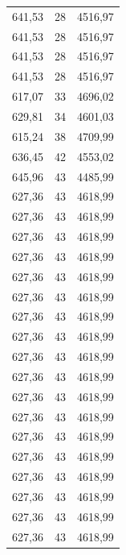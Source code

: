 \begin{center}
\begin{longtable}{|l|l|l|}
641,53            & 28               & 4516,97        \\
641,53            & 28               & 4516,97        \\
641,53            & 28               & 4516,97        \\
641,53            & 28               & 4516,97        \\
617,07            & 33               & 4696,02        \\
629,81            & 34               & 4601,03        \\
615,24            & 38               & 4709,99        \\
636,45            & 42               & 4553,02        \\
645,96            & 43               & 4485,99        \\
627,36            & 43               & 4618,99        \\
627,36            & 43               & 4618,99        \\
627,36            & 43               & 4618,99        \\
627,36            & 43               & 4618,99        \\
627,36            & 43               & 4618,99        \\
627,36            & 43               & 4618,99        \\
627,36            & 43               & 4618,99        \\
627,36            & 43               & 4618,99        \\
627,36            & 43               & 4618,99        \\
627,36            & 43               & 4618,99        \\
627,36            & 43               & 4618,99        \\
627,36            & 43               & 4618,99        \\
627,36            & 43               & 4618,99        \\
627,36            & 43               & 4618,99        \\
627,36            & 43               & 4618,99        \\
627,36            & 43               & 4618,99        \\
627,36            & 43               & 4618,99        \\
627,36            & 43               & 4618,99        \\

\end{longtable}
\end{center}
